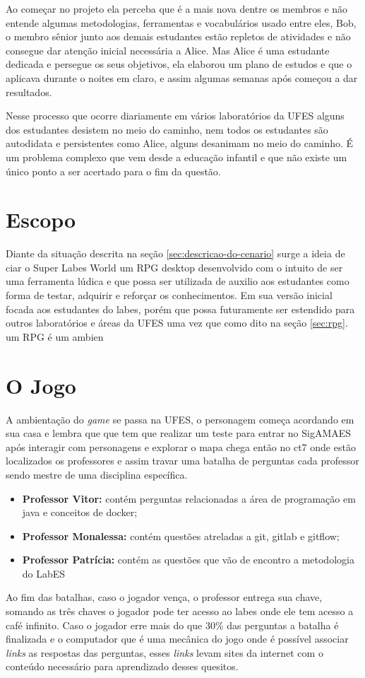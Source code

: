 Ao começar no projeto ela perceba que é a mais nova dentre os membros e não entende algumas metodologias, ferramentas e vocabulários usado entre eles, Bob, o membro sênior junto aos demais estudantes estão repletos de atividades e não consegue dar atenção inicial necessária a Alice. Mas Alice é uma estudante dedicada e persegue os seus objetivos, ela elaborou um plano de estudos e que o aplicava durante o noites em claro, e assim algumas semanas após começou a dar resultados.

Nesse processo que ocorre diariamente em vários laboratórios da UFES alguns dos estudantes desistem no meio do caminho, nem todos os estudantes são autodidata e persistentes como Alice, alguns desanimam no meio do caminho. É um problema complexo que vem desde a educação infantil e que não existe um único ponto a ser acertado para o fim da questão. 

\section{Escopo}
\label{sec:escopo}
Diante da situação descrita na seção \ref{sec:descricao-do-cenario} surge a ideia de ciar o Super Labes World um RPG desktop desenvolvido com o intuito de ser uma ferramenta lúdica e que possa ser utilizada de auxilio aos estudantes como forma de testar, adquirir e reforçar os conhecimentos. Em sua versão inicial focada aos estudantes do labes, porém que possa futuramente ser estendido para outros laboratórios e áreas da UFES uma vez que como dito na seção \ref{sec:rpg}. um RPG é um ambien

\section{O Jogo}
\label{sec:jogo}
A ambientação do \textit{game} se passa na UFES, o personagem começa acordando em sua casa e lembra que que tem que realizar um teste para entrar no SigAMAES após interagir com personagens e explorar o mapa chega então no ct7 onde estão localizados os professores e assim travar uma batalha de perguntas cada professor sendo mestre de uma disciplina específica.
\begin{itemize}
    \item \textbf{Professor Vitor: }contém perguntas relacionadas a área de programação em java e conceitos de docker;
    \item \textbf{Professor Monalessa: }contém questões atreladas a git, gitlab e gitflow;
    \item \textbf{Professor Patrícia: } contém as questões que vão de encontro a metodologia do LabES
\end{itemize}
Ao fim das batalhas, caso o jogador vença, o professor entrega sua chave, somando as três chaves o jogador pode ter acesso ao labes onde ele tem acesso a café infinito.
Caso o jogador erre mais do que 30\% das perguntas a batalha é finalizada e o computador que é uma mecânica do jogo onde é possível associar  \textit{links} as respostas das perguntas, esses \textit{links} levam sites da internet com o conteúdo necessário para aprendizado desses quesitos.


